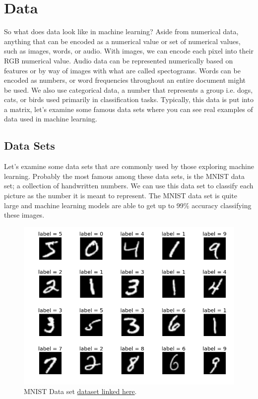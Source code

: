 \documentclass{article}
\begin{document}
\newpage
\section{Data}
So what does data look like in machine learning? 
Aside from numerical data, anything that can be encoded as a numerical value or set of numerical values, such as images, words, or audio. 
With images, we can encode each pixel into their RGB numerical value. 
Audio data can be represented numerically based on features or by way of images with what are called spectograms. 
Words can be encoded as numbers, or word frequencies throughout an entire document might be used. 
We also use categorical data, a number that represents a group i.e. dogs, cats, or birds used primarily in classification tasks. 
Typically, this data is put into a matrix, let's examine some famous data sets where you can see real examples of data used in machine learning.

\subsection{Data Sets}
Let's examine some data sets that are commonly used by those exploring machine learning. Probably the most famous among these data sets, is the MNIST data set; a collection of handwritten numbers. We can use this data set to classify each picture as the number it is meant to represent. The MNIST data set is quite large and machine learning models are able to get up to 99\% accuracy classifying these images.

\begin{figure}[H]
    \centering
    \includegraphics[width=4.5in]{mnist.png}
    \caption{MNIST Data set \href{http://yann.lecun.com/exdb/mnist/}{dataset linked here}.}
\end{figure}
\end{document}
